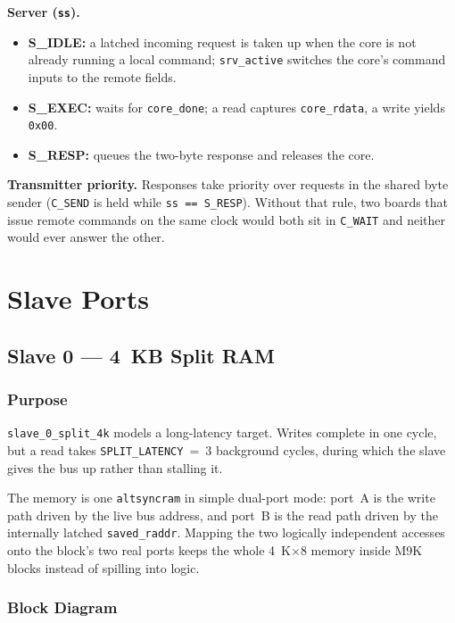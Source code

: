 \documentclass[11pt,a4paper]{article}
\newcommand{\sig}[1]{\texttt{#1}}
\begin{document}
\textbf{Server (\sig{ss}).}
\begin{itemize}
    \item \textbf{S\_IDLE:} a latched incoming request is taken up when the core
          is not already running a local command; \sig{srv\_active} switches the
          core's command inputs to the remote fields.
    \item \textbf{S\_EXEC:} waits for \sig{core\_done}; a read captures
          \sig{core\_rdata}, a write yields \sig{0x00}.
    \item \textbf{S\_RESP:} queues the two-byte response and releases the core.
\end{itemize}

\textbf{Transmitter priority.} Responses take priority over requests in the
shared byte sender (\sig{C\_SEND} is held while \sig{ss == S\_RESP}). Without
that rule, two boards that issue remote commands on the same clock would both
sit in \sig{C\_WAIT} and neither would ever answer the other.

\section{Slave Ports}

\subsection{Slave 0 --- 4~KB Split RAM}

\subsubsection{Purpose}

\sig{slave\_0\_split\_4k} models a long-latency target. Writes complete in one
cycle, but a read takes \sig{SPLIT\_LATENCY}~=~3 background cycles, during which
the slave gives the bus up rather than stalling it.

The memory is one \sig{altsyncram} in simple dual-port mode: port~A is the
write path driven by the live bus address, and port~B is the read path driven
by the internally latched \sig{saved\_raddr}. Mapping the two logically
independent accesses onto the block's two real ports keeps the whole
4~K$\times$8 memory inside M9K blocks instead of spilling into logic.

\subsubsection{Block Diagram}
\end{document}
